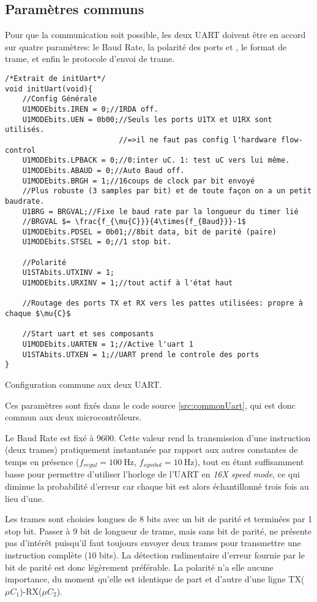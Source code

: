 \subsection{Paramètres communs}
Pour que la communication soit possible, les deux UART doivent être en accord sur quatre paramètres: le Baud Rate, la polarité des ports  et , le format de trame, et enfin le protocole d'envoi de trame.
\begin{listing}[htbp]
\begin{verbatim}
/*Extrait de initUart*/
void initUart(void){
    //Config Générale
    U1MODEbits.IREN = 0;//IRDA off.
    U1MODEbits.UEN = 0b00;//Seuls les ports U1TX et U1RX sont utilisés.
                          //=>il ne faut pas config l'hardware flow-control
    U1MODEbits.LPBACK = 0;//0:inter uC. 1: test uC vers lui même.
    U1MODEbits.ABAUD = 0;//Auto Baud off.
    U1MODEbits.BRGH = 1;//16coups de clock par bit envoyé
    //Plus robuste (3 samples par bit) et de toute façon on a un petit baudrate.
    U1BRG = BRGVAL;//Fixe le baud rate par la longueur du timer lié
    //BRGVAL $= \frac{f_{\mu{C}}}{4\times{f_{Baud}}}-1$
    U1MODEbits.PDSEL = 0b01;//8bit data, bit de parité (paire)
    U1MODEbits.STSEL = 0;//1 stop bit.

    //Polarité
    U1STAbits.UTXINV = 1;
    U1MODEbits.URXINV = 1;//tout actif à l'état haut

    //Routage des ports TX et RX vers les pattes utilisées: propre à chaque $\mu{C}$

    //Start uart et ses composants
    U1MODEbits.UARTEN = 1;//Active l'uart 1
    U1STAbits.UTXEN = 1;//UART prend le controle des ports
}
\end{verbatim}
\caption{Configuration commune aux deux UART.\label{src:commonUart}}
\end{listing}
Ces paramètres sont fixés dans le code source \ref{src:commonUart}, qui est donc commun aux deux microcontrôleurs.

Le Baud Rate est fixé à \num{9600}. Cette valeur rend la transmission d'une instruction (deux trames) pratiquement instantanée par rapport aux autres constantes de temps en présence ($f_{regul} = \SI{100}{\hertz}$, $f_{symbol} = \SI{10}{\hertz}$), tout en étant suffisamment basse pour permettre d'utiliser l'horloge de l'UART en \emph{16X speed mode}, ce qui diminue la probabilité d'erreur car chaque bit est alors échantillonné trois fois au lieu d'une.

Les trames sont choisies longues de 8 bits avec un bit de parité et terminées par 1 stop bit. Passer à 9 bit de longueur de trame, mais sans bit de parité, ne présente pas d'intérêt puisqu'il faut toujours envoyer deux trames pour transmettre une instruction complète (10 bits). La détection rudimentaire d'erreur fournie par le bit de parité est donc légèrement préférable. La polarité n'a elle aucune importance, du moment qu'elle est identique de part et d'autre d'une ligne TX($\mu C_1$)-RX($\mu C_2$).

